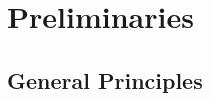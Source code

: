 \chapter{Preliminaries}
\label{chapter:preliminaries}

\section{General Principles}
\label{sec:general-principles}



